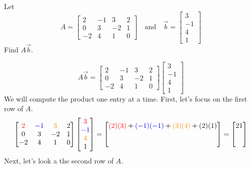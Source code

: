 \documentclass{ximera}
\begin{document}
\begin{example}Let $$A=\begin{bmatrix}2&-1&3&2\\0&3&-2&1\\-2&4&1&0\end{bmatrix}\quad\text{and}\quad \vec{b}=\begin{bmatrix}3\\-1\\4\\1\end{bmatrix}$$ Find $A\vec{b}$.
\begin{explanation}
$$A\vec{b}=\begin{bmatrix}2&-1&3&2\\0&3&-2&1\\-2&4&1&0\end{bmatrix}\begin{bmatrix}3\\-1\\4\\1\end{bmatrix}$$
We will compute the product one entry at a time.  First, let's focus on the first row of $A$.
$$\begin{bmatrix}{\color{red}2}&{\color{blue}-1}&{\color{orange}3}&2\\0&3&-2&1\\-2&4&1&0\end{bmatrix}\begin{bmatrix}{\color{red}3}\\{\color{blue}-1}\\{\color{orange}4}\\1\end{bmatrix}=\begin{bmatrix}{\color{red}(2)( 3)}+{\color{blue}(-1)(-1)}+{\color{orange}(3)(4)}+(2)(1)\\ \\ \\\end{bmatrix}=\begin{bmatrix}21\\ \\ \\\end{bmatrix}
$$
Next, let's look a the second row of $A$.

\end{explanation}
\end{example}
\end{document}

